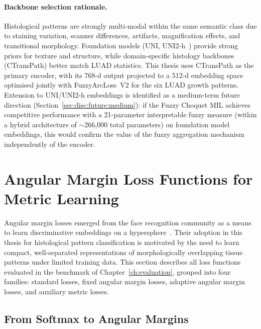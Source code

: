 \paragraph{Backbone selection rationale.}
Histological patterns are strongly multi-modal within the same semantic
class due to staining variation, scanner differences, artifacts,
magnification effects, and transitional morphology.
Foundation models (UNI, UNI2-h~\cite{chen2024uni}) provide strong priors
for texture and structure, while domain-specific histology backbones
(CTransPath) better match LUAD statistics.
This thesis uses CTransPath as the primary encoder, with its 768-d output
projected to a 512-d embedding space optimised jointly with FuzzyArcLoss~V2
for the six LUAD growth patterns.
Extension to UNI/UNI2-h embeddings is identified as a medium-term future
direction (Section~\ref{sec:disc:future:medium}): if the Fuzzy Choquet MIL
achieves competitive performance with a 21-parameter interpretable
fuzzy measure (within a hybrid architecture of $\sim$266{,}000 total
parameters) on foundation model embeddings, this would confirm the
value of the fuzzy aggregation mechanism independently of the encoder.


\section{Angular Margin Loss Functions for Metric Learning}
\label{sec:bg:angular_margin}

Angular margin losses emerged from the face recognition community as a means to learn discriminative embeddings on a hypersphere~\cite{deng2019arcface,wang2018cosface,liu2017sphereface}.
Their adoption in this thesis for histological pattern classification is motivated by the need to learn compact, well-separated representations of morphologically overlapping tissue patterns under limited training data.
This section describes all loss functions evaluated in the benchmark of Chapter~\ref{ch:evaluation}, grouped into four families: standard losses, fixed angular margin losses, adaptive angular margin losses, and auxiliary metric losses.

\subsection{From Softmax to Angular Margins}
\label{sec:bg:softmax_to_arc}

